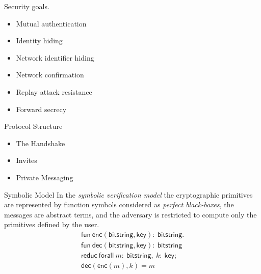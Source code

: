 \documentclass{beamer}
\begin{document}
\begin{frame}{Security goals.}
\begin{itemize}
    \item Mutual authentication
    \item Identity hiding
    \item Network identifier hiding
    \item Network confirmation
    \item Replay attack resistance
    \item Forward secrecy
\end{itemize}

\end{frame}


\begin{frame}{Protocol Structure}
\begin{itemize}
    \item The Handshake
    \item Invites
    \item Private Messaging
\end{itemize}
\end{frame}



\begin{frame}{Symbolic Model}
    In the \textit{symbolic verification model} the cryptographic primitives are represented by function symbols considered as \textit{perfect black-boxes}, the messages are abstract terms,
    and the adversary is restricted to compute only the primitives defined by the user. \\


    \begin{equation*}\begin{array}{l}
        \mathsf{fun}\ \mathsf{enc}(\mathsf{bitstring}, \mathsf{key}):\ \mathsf{bitstring}. \\
        \mathsf{fun}\ \mathsf{dec}(\mathsf{bitstring}, \mathsf{key}):\ \mathsf{bitstring} \\
        \mathsf{reduc}\ \mathsf{forall}\ m:\ \mathsf{bitstring},\ k:\ \mathsf{key}; \\
        \mathsf{dec}(\mathsf{enc}(m),k) = m \\
    \end{array}\end{equation*}

\end{frame}
\end{document}

